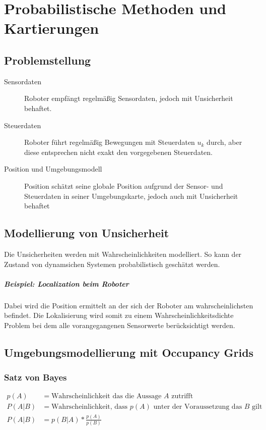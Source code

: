 \chapter{Probabilistische Methoden und Kartierungen}
\section{Problemstellung}

\begin{description}
	\item[Sensordaten] Roboter empfängt regelmäßig Sensordaten, jedoch mit
		Unsicherheit behaftet.
	\item[Steuerdaten] Roboter führt regelmäßig Bewegungen mit Steuerdaten $u_k$
		durch, aber diese entspre\-chen nicht exakt den vorgegebenen Steuerdaten.
	\item[Position und Umgebungsmodell] Position schätzt seine globale Position
		aufgrund der Sensor- und Steuerdaten in seiner Umgebungskarte, jedoch auch
		mit Unsicherheit behaftet
\end{description}

\section{Modellierung von Unsicherheit}
Die Unsicherheiten werden mit Wahrscheinlichkeiten modelliert. So kann der
Zustand von dynamsichen Systemen probabilistisch geschätzt werden.

\paragraph{Beispiel: Localization beim Roboter}
Dabei wird die Position ermittelt an der sich der Roboter am
wahrscheinlichsten befindet. Die Lokalisierung wird somit zu einem
Wahrscheinlichkeitsdichte Problem bei dem alle vorangegangenen Sensorwerte
berücksichtigt werden.

\section{Umgebungsmodellierung mit Occupancy Grids}
\subsection{Satz von Bayes}
\begin{align*}
	p(A) &= \text{Wahrscheinlichkeit das die Aussage } A \text{ zutrifft} \\
	P(A|B) &= \text{Wahrscheinlichkeit, dass } p(A) \text{ unter der
									Voraussetzung das }B\text{ gilt} \\
  P(A|B) &= p(B|A) * \frac{p(A)}{p(B)}
\end{align*}

